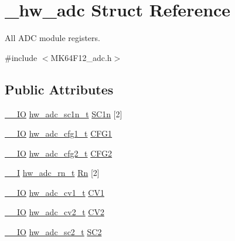\hypertarget{struct__hw__adc}{}\section{\+\_\+hw\+\_\+adc Struct Reference}
\label{struct__hw__adc}


All A\+DC module registers.  




{\ttfamily \#include $<$M\+K64\+F12\+\_\+adc.\+h$>$}

\subsection*{Public Attributes}
\begin{DoxyCompactItemize}
\item 
\hyperlink{core__sc300_8h_aec43007d9998a0a0e01faede4133d6be}{\+\_\+\+\_\+\+IO} \hyperlink{union__hw__adc__sc1n}{hw\+\_\+adc\+\_\+sc1n\+\_\+t} \hyperlink{struct__hw__adc_a53ed1272b44a1a74bb07fa80a5a1f7d2}{S\+C1n} \mbox{[}2\mbox{]}
\item 
\hyperlink{core__sc300_8h_aec43007d9998a0a0e01faede4133d6be}{\+\_\+\+\_\+\+IO} \hyperlink{union__hw__adc__cfg1}{hw\+\_\+adc\+\_\+cfg1\+\_\+t} \hyperlink{struct__hw__adc_a3c23c49ae8be95469b9e12844efa3942}{C\+F\+G1}
\item 
\hyperlink{core__sc300_8h_aec43007d9998a0a0e01faede4133d6be}{\+\_\+\+\_\+\+IO} \hyperlink{union__hw__adc__cfg2}{hw\+\_\+adc\+\_\+cfg2\+\_\+t} \hyperlink{struct__hw__adc_afb4756c11d123acdda0385371478f5ed}{C\+F\+G2}
\item 
\hyperlink{core__sc300_8h_af63697ed9952cc71e1225efe205f6cd3}{\+\_\+\+\_\+I} \hyperlink{union__hw__adc__rn}{hw\+\_\+adc\+\_\+rn\+\_\+t} \hyperlink{struct__hw__adc_a6c97822d9f34a22267bf4c6c37820965}{Rn} \mbox{[}2\mbox{]}
\item 
\hyperlink{core__sc300_8h_aec43007d9998a0a0e01faede4133d6be}{\+\_\+\+\_\+\+IO} \hyperlink{union__hw__adc__cv1}{hw\+\_\+adc\+\_\+cv1\+\_\+t} \hyperlink{struct__hw__adc_aba2f2d11c5b29e7d1ee7bf47957834dd}{C\+V1}
\item 
\hyperlink{core__sc300_8h_aec43007d9998a0a0e01faede4133d6be}{\+\_\+\+\_\+\+IO} \hyperlink{union__hw__adc__cv2}{hw\+\_\+adc\+\_\+cv2\+\_\+t} \hyperlink{struct__hw__adc_a493cd16657860f376172a537134e398c}{C\+V2}
\item 
\hyperlink{core__sc300_8h_aec43007d9998a0a0e01faede4133d6be}{\+\_\+\+\_\+\+IO} \hyperlink{union__hw__adc__sc2}{hw\+\_\+adc\+\_\+sc2\+\_\+t} \hyperlink{struct__hw__adc_a1defe1c9e0a5b5d3d5a9791c58d1dde7}{S\+C2}

\end{DoxyCompactItemize}
